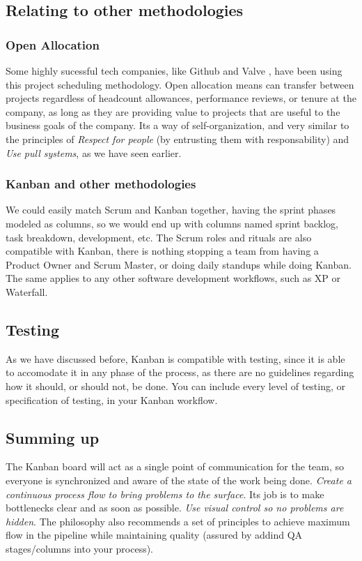 \documentclass[conference]{IEEEtran}
\begin{document}
\subsection{Relating to other methodologies}
\subsubsection{Open Allocation}
Some highly sucessful tech companies, like Github and Valve \cite{openalloc}, have been using
this project scheduling methodology. Open allocation means can transfer between
projects regardless of headcount allowances, performance reviews, or tenure at
the company, as long as they are providing value to projects that are useful to
the business goals of the company. Its a way of self-organization, and very
similar to the principles of \textit{Respect for people} (by entrusting them
with responsability) and \textit{Use pull systems}, as we have seen earlier.
\subsubsection{Kanban and other methodologies}
We could easily match Scrum and Kanban together, having the sprint phases modeled
as columns, so we would end up with columns named sprint backlog, task breakdown,
development, etc. The Scrum roles and rituals are also compatible with Kanban,
there is nothing stopping a team from having a Product Owner and Scrum Master,
or doing daily standups while doing Kanban.
The same applies to any other software development workflows, such
as XP or Waterfall.

\subsection{Testing}
As we have discussed before, Kanban is compatible with testing, since it is able to
accomodate it in any phase of the process, as there are no guidelines regarding how it should, or should not, be done.
You can include every level of testing, or specification of testing, in your Kanban
workflow.

\subsection{Summing up} %
The Kanban board will act as a single point of communication for the
team, so everyone is synchronized and aware of the state of the work being done.
\textit{Create a continuous process flow to bring problems to the surface}.
Its job is to make bottlenecks clear and as soon as possible. \textit{Use visual control so no problems are hidden}.
The philosophy also recommends a set of principles to achieve maximum flow in the
pipeline while maintaining quality (assured by addind QA stages/columns into your process).
\end{document}

